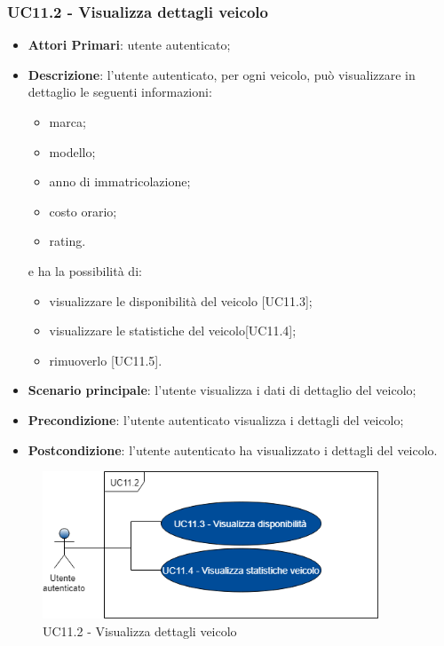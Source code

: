 \subsubsection{UC11.2 - Visualizza dettagli veicolo}
\begin{itemize}
	\item \textbf{Attori Primari}: utente autenticato;
	\item \textbf{Descrizione}: l'utente autenticato, per ogni veicolo, può visualizzare in dettaglio le seguenti informazioni:
	\begin{itemize}
		\item marca;
		\item modello;
		\item anno di immatricolazione;
		\item costo orario;
		\item rating.
	\end{itemize}
	e ha la possibilità di:
	\begin{itemize}
		\item visualizzare le disponibilità del veicolo [UC11.3];
		\item visualizzare le statistiche del veicolo[UC11.4];
		\item rimuoverlo [UC11.5].
	\end{itemize}
	\item \textbf{Scenario principale}: l'utente visualizza i dati di dettaglio del veicolo;
	\item \textbf{Precondizione}: l'utente autenticato visualizza i dettagli del veicolo;
	\item \textbf{Postcondizione}: l'utente autenticato ha visualizzato i dettagli del veicolo.
\end{itemize}
\begin{figure}[H]
	\includegraphics[width=10cm]{res/images/UC11Dettagli.png}
	\centering
	\caption{UC11.2 - Visualizza dettagli veicolo}
\end{figure}
